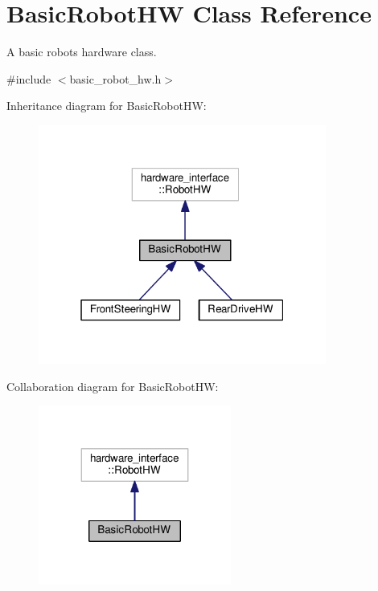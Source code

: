 \hypertarget{classBasicRobotHW}{}\section{Basic\+Robot\+HW Class Reference}
\label{classBasicRobotHW}


A basic robot\textquotesingle{}s hardware class.  




{\ttfamily \#include $<$basic\+\_\+robot\+\_\+hw.\+h$>$}



Inheritance diagram for Basic\+Robot\+HW\+:\nopagebreak
\begin{figure}[H]
\begin{center}
\leavevmode
\includegraphics[width=268pt]{classBasicRobotHW__inherit__graph}
\end{center}
\end{figure}


Collaboration diagram for Basic\+Robot\+HW\+:\nopagebreak
\begin{figure}[H]
\begin{center}
\leavevmode
\includegraphics[width=179pt]{classBasicRobotHW__coll__graph}
\end{center}
\end{figure}
